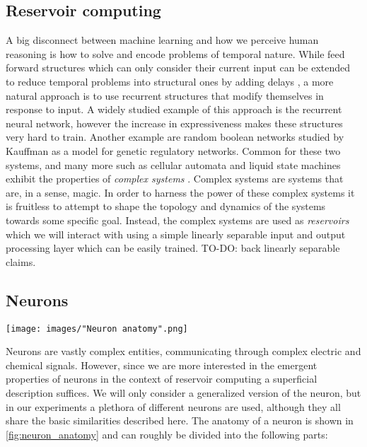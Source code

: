 \documentclass[journal]{IEEEtran}
\begin{document}
\subsection{Reservoir computing}
A big disconnect between machine learning and how we perceive human reasoning is
how to solve and encode problems of temporal nature.
While feed forward structures which can only consider their current input can be
extended to reduce temporal problems into structural ones by adding delays
\cite{schrauwen_overview_2007}, a more natural approach is to use
recurrent structures that modify themselves in response to input.
A widely studied example of this approach is the recurrent neural network,
however the increase in expressiveness makes these structures very hard to train\cite{bertschinger_real-time_2004}.
Another example are random boolean networks \cite{gershenson_introduction_2004} studied by Kauffman as a
model for genetic regulatory networks.
Common for these two systems, and many more such as cellular
automata \cite{sipper_emergence_1999} and liquid state machines exhibit the
properties of \textit{complex systems} \cite{langton_computation_1990}.
Complex systems are systems that are, in a sense, magic.
In order to harness the power of these complex systems it is fruitless to
attempt to shape the topology and dynamics of the systems towards some specific
goal. Instead, the complex systems are used as \textit{reservoirs} which we will
interact with using a simple linearly separable input and output processing
layer which can be easily trained. \cite{schrauwen_overview_2007}
TO-DO: back linearly separable claims.
\subsection{Neurons}
\begin{figure*}[p]
    \centering
    \texttt{[image: images/"Neuron anatomy".png]}
    \caption{a neuron}
    \label{fig:neuron_anatomy}
\end{figure*}
Neurons are vastly complex entities, communicating through complex electric
and chemical signals. However, since we are more interested in the emergent
properties of neurons in the context of reservoir computing a superficial
description suffices.
We will only consider a generalized version of the neuron, but in our
experiments a plethora of different neurons are used, although they
all share the basic similarities described here.
The anatomy of a neuron is shown in \ref{fig:neuron_anatomy} and can roughly be
divided into the following parts:
\end{document}
